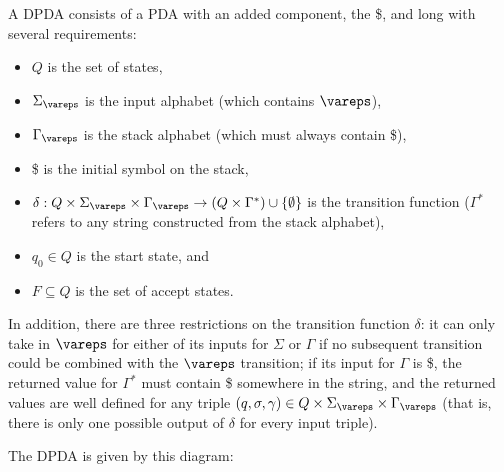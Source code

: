\documentclass[solution, letterpaper]{cs121}
\begin{document}
\begin{solution}
\subsolution A DPDA consists of a PDA with an added component, the \$, and long with several requirements: 
\begin{itemize}
	\item $Q$ is the set of states,
	\item $\Sigma_\vareps$ is the input alphabet (which contains $\vareps$),
	\item $\Gamma_\vareps$ is the stack alphabet (which must always contain \$),
	\item \$ is the initial symbol on the stack,
	\item $\delta: Q \times \Sigma_\vareps \times \Gamma_\vareps \rightarrow (Q \times \Gamma^*) \cup \{\emptyset\}$ is the transition function ($\Gamma^*$ refers to any string constructed from the stack alphabet),
	\item $q_0 \in Q$ is the start state, and
	\item $F \subseteq Q$ is the set of accept states.
\end{itemize}

In addition, there are three restrictions on the transition function $\delta$: it can only take in $\vareps$ for either of its inputs for $\Sigma$ or $\Gamma$ if no subsequent transition could be combined with the $\vareps$ transition; if its input for $\Gamma$ is \$, the returned value for $\Gamma^*$ must contain \$ somewhere in the string, and the returned values are well defined for any triple $(q, \sigma, \gamma) \in Q \times \Sigma_\vareps \times \Gamma_\vareps$ (that is, there is only one possible output of $\delta$ for every input triple).

\subsolution The DPDA is given by this diagram:
\begin{center}
\end{center}


\end{solution}
\end{document}
